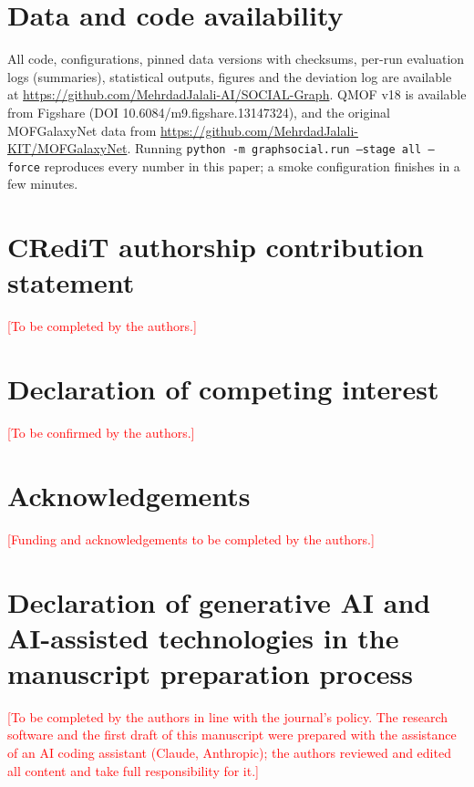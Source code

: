 \begingroup\sloppy
\section*{Data and code availability}
\label{sec:availability}
All code, configurations, pinned data versions with checksums, per-run evaluation logs (summaries), statistical outputs, figures and the deviation log are available at \url{https://github.com/MehrdadJalali-AI/SOCIAL-Graph}. QMOF v18 is available from Figshare (DOI 10.6084/m9.figshare.13147324), and the original MOFGalaxyNet data from \url{https://github.com/MehrdadJalali-KIT/MOFGalaxyNet}. Running \texttt{python -m graphsocial.run --stage all --force} reproduces every number in this paper; a smoke configuration finishes in a few minutes.

\section*{CRediT authorship contribution statement}
\textcolor{red}{[To be completed by the authors.]}

\section*{Declaration of competing interest}
\textcolor{red}{[To be confirmed by the authors.]}

\section*{Acknowledgements}
\textcolor{red}{[Funding and acknowledgements to be completed by the authors.]}

\section*{Declaration of generative AI and AI-assisted technologies in the manuscript preparation process}
\textcolor{red}{[To be completed by the authors in line with the journal's policy. The research software and the first draft of this manuscript were prepared with the assistance of an AI coding assistant (Claude, Anthropic); the authors reviewed and edited all content and take full responsibility for it.]}
\endgroup
